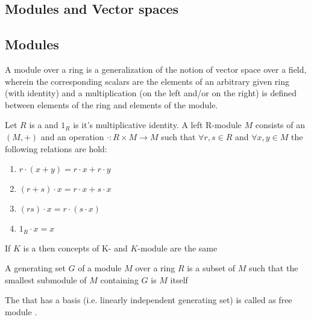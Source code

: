 \begin{appendices}
\section{Modules and Vector spaces}

\subsection{Modules}

A module over a ring is a generalization of the notion of vector space
over a field, wherein the corresponding scalars are the elements of an
arbitrary given ring (with identity) and a multiplication (on the left
and/or on the right) is defined between elements of the ring and
elements of the module.

\begin{definition}[Module]
  Let $R$ is a  and $1_R$ is it's multiplicative
  identity. A left R-module $M$ consists of an 
  $\left(M, +\right)$ and an operation $\cdot: R \times M \to M$ such
  that $\forall r,s \in R$ and $\forall x,y \in M$ the following
  relations are hold:
  \begin{enumerate}
  \item $r \cdot \left(x+y\right) = r \cdot x + r \cdot y$
  \item $\left(r + s \right) \cdot x = r \cdot x + s \cdot x$
  \item $\left(rs\right) \cdot x = r \cdot \left(s \cdot x\right)$
  \item $1_R \cdot x = x$
  \end{enumerate}
  \label{def:module}
\end{definition}

\begin{example}[Module]
  If $K$ is a  then concepts of
  K- and $K$-module are the same
\end{example}

\begin{definition}
  A generating set $G$ of a module $M$ over a ring $R$ is a subset of
  $M$ such that the smallest submodule of $M$ containing $G$ is $M$
  itself \cite{wiki:gsmodule}
  \label{def:gsmodule}
\end{definition}

\begin{definition}
  The  that has a basis (i.e. linearly independent
  generating set) 
  is called as free module \cite{wiki:freemodule}.


\end{definition}
\end{appendices}
